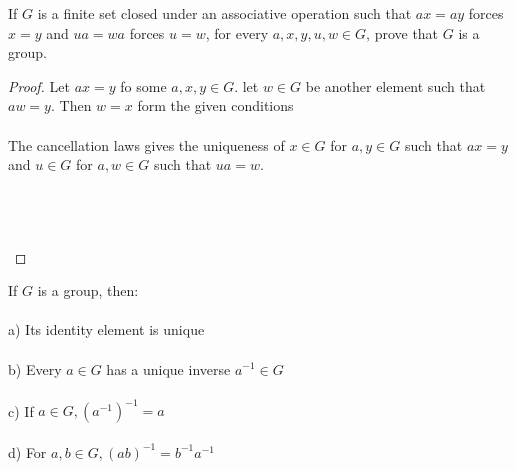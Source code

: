 \documentclass[12pt]{article}
\newenvironment{lemma}[2][Lemma]{\begin{trivlist}
\item[\hskip \labelsep {\bfseries #1}\hskip \labelsep {\bfseries #2.}]}{\end{trivlist}}
\newenvironment{problem}[2][Problem]{\begin{trivlist}
\item[\hskip \labelsep {\bfseries #1}\hskip \labelsep {\bfseries #2.}]}{\end{trivlist}}
\begin{document}
\begin{problem}{2.2.2}
If $G$ is a finite set closed under an associative operation such that $ax=ay$ forces $x=y$ and $ua = wa$ forces $u=w$, for every $a,x,y,u,w \in G$, prove that $G$ is a group.
\end{problem}

\begin{proof}
Let $ax = y$ fo some $a,x,y \in G$. let $w \in G$ be another element such that $aw = y$. Then $w=x$ form the given conditions \\ \\
The cancellation laws gives the uniqueness of $x \in G$ for $a,y \in G$ such that $ax = y$ and $u \in G$ for $a,w \in G$ such that $ua = w$. \\ \\
\centerline{} \\ \\
\end{proof}

\begin{lemma}{2.2.1}
If $G$ is a group, then: \\ \\
a) Its identity element is unique \\ \\
b) Every $a \in G$ has a unique inverse $a^{-1} \in G$ \\ \\
c) If $a \in G, (a^{-1})^{-1} = a$ \\ \\
d) For $a,b \in G, (ab)^{-1} = b^{-1}a^{-1}$
\end{lemma}
\end{document}

